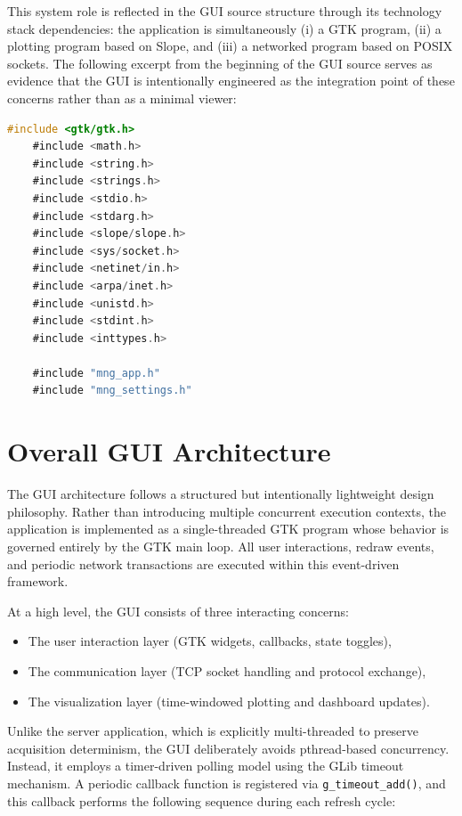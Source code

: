 This system role is reflected in the GUI source structure through its technology stack dependencies: the application is simultaneously (i) a GTK program, (ii) a plotting program based on Slope, and (iii) a networked program based on POSIX sockets. The following excerpt from the beginning of the GUI source serves as evidence that the GUI is intentionally engineered as the integration point of these concerns rather than as a minimal viewer:

\begin{lstlisting}[language=C]
	#include <gtk/gtk.h>
	#include <math.h>
	#include <string.h>
	#include <strings.h>
	#include <stdio.h>
	#include <stdarg.h>
	#include <slope/slope.h>
	#include <sys/socket.h>
	#include <netinet/in.h>
	#include <arpa/inet.h>
	#include <unistd.h>
	#include <stdint.h>
	#include <inttypes.h>
	
	#include "mng_app.h"
	#include "mng_settings.h"
\end{lstlisting}

\section{Overall GUI Architecture}

The GUI architecture follows a structured but intentionally lightweight design philosophy. Rather than introducing multiple concurrent execution contexts, the application is implemented as a single-threaded GTK program whose behavior is governed entirely by the GTK main loop. All user interactions, redraw events, and periodic network transactions are executed within this event-driven framework.

At a high level, the GUI consists of three interacting concerns:

\begin{itemize}
	\item The user interaction layer (GTK widgets, callbacks, state toggles),
	\item The communication layer (TCP socket handling and protocol exchange),
	\item The visualization layer (time-windowed plotting and dashboard updates).
\end{itemize}

Unlike the server application, which is explicitly multi-threaded to preserve acquisition determinism, the GUI deliberately avoids pthread-based concurrency. Instead, it employs a timer-driven polling model using the GLib timeout mechanism. A periodic callback function is registered via \texttt{g\_timeout\_add()}, and this callback performs the following sequence during each refresh cycle:

